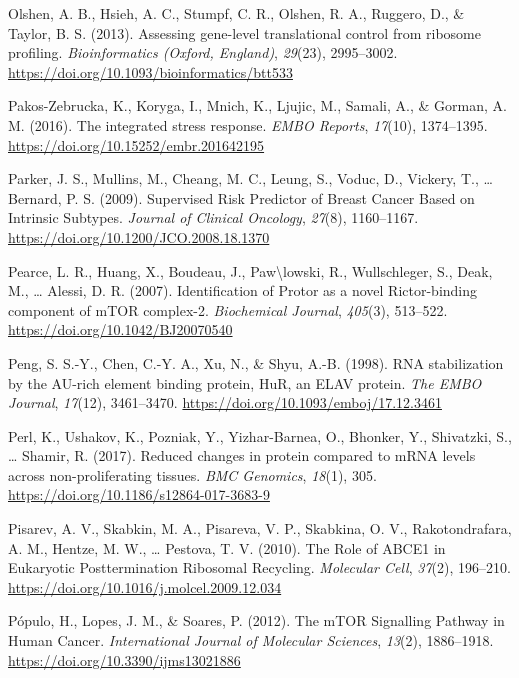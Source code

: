 \documentclass[12pt,openany]{book}
\begin{document}
\hypertarget{ref-Olshen2013}{}
Olshen, A. B., Hsieh, A. C., Stumpf, C. R., Olshen, R. A., Ruggero, D.,
\& Taylor, B. S. (2013). Assessing gene-level translational control from
ribosome profiling. \emph{Bioinformatics (Oxford, England)},
\emph{29}(23), 2995--3002.
\url{https://doi.org/10.1093/bioinformatics/btt533}

\hypertarget{ref-Pakos-Zebrucka2016}{}
Pakos-Zebrucka, K., Koryga, I., Mnich, K., Ljujic, M., Samali, A., \&
Gorman, A. M. (2016). The integrated stress response. \emph{EMBO
Reports}, \emph{17}(10), 1374--1395.
\url{https://doi.org/10.15252/embr.201642195}

\hypertarget{ref-Parker2009}{}
Parker, J. S., Mullins, M., Cheang, M. C., Leung, S., Voduc, D.,
Vickery, T., \ldots{} Bernard, P. S. (2009). Supervised Risk Predictor
of Breast Cancer Based on Intrinsic Subtypes. \emph{Journal of Clinical
Oncology}, \emph{27}(8), 1160--1167.
\url{https://doi.org/10.1200/JCO.2008.18.1370}

\hypertarget{ref-Pearce2007}{}
Pearce, L. R., Huang, X., Boudeau, J., Paw\textbackslash{}lowski, R.,
Wullschleger, S., Deak, M., \ldots{} Alessi, D. R. (2007).
Identification of Protor as a novel Rictor-binding component of mTOR
complex-2. \emph{Biochemical Journal}, \emph{405}(3), 513--522.
\url{https://doi.org/10.1042/BJ20070540}

\hypertarget{ref-Peng1998}{}
Peng, S. S.-Y., Chen, C.-Y. A., Xu, N., \& Shyu, A.-B. (1998). RNA
stabilization by the AU-rich element binding protein, HuR, an ELAV
protein. \emph{The EMBO Journal}, \emph{17}(12), 3461--3470.
\url{https://doi.org/10.1093/emboj/17.12.3461}

\hypertarget{ref-Perl2017}{}
Perl, K., Ushakov, K., Pozniak, Y., Yizhar-Barnea, O., Bhonker, Y.,
Shivatzki, S., \ldots{} Shamir, R. (2017). Reduced changes in protein
compared to mRNA levels across non-proliferating tissues. \emph{BMC
Genomics}, \emph{18}(1), 305.
\url{https://doi.org/10.1186/s12864-017-3683-9}

\hypertarget{ref-Pisarev2010}{}
Pisarev, A. V., Skabkin, M. A., Pisareva, V. P., Skabkina, O. V.,
Rakotondrafara, A. M., Hentze, M. W., \ldots{} Pestova, T. V. (2010).
The Role of ABCE1 in Eukaryotic Posttermination Ribosomal Recycling.
\emph{Molecular Cell}, \emph{37}(2), 196--210.
\url{https://doi.org/10.1016/j.molcel.2009.12.034}

\hypertarget{ref-Populo2012}{}
Pópulo, H., Lopes, J. M., \& Soares, P. (2012). The mTOR Signalling
Pathway in Human Cancer. \emph{International Journal of Molecular
Sciences}, \emph{13}(2), 1886--1918.
\url{https://doi.org/10.3390/ijms13021886}
\end{document}
